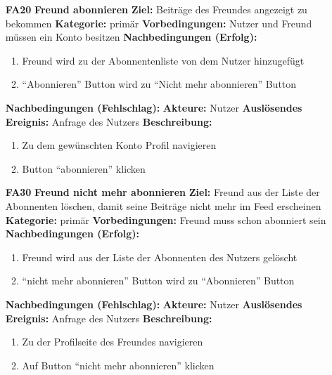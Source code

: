 \documentclass[parskip=full]{scrartcl}
\begin{document}
\begin{itemize}[nosep]
			\item[\textbf{\large FA20}]\textbf{\large Freund abonnieren}
				\newline\newline \textbf{Ziel:} Beiträge des Freundes angezeigt zu bekommen
				\newline \textbf{Kategorie:} primär
				\newline \textbf{Vorbedingungen:} Nutzer und Freund müssen ein Konto besitzen
				\newline \textbf{Nachbedingungen (Erfolg):} 
				\begin{enumerate}[nosep]
					\item Freund wird zu der Abonnentenliste von dem Nutzer hinzugefügt
					\item “Abonnieren” Button wird zu “Nicht mehr abonnieren” Button
				\end{enumerate}
				\textbf{Nachbedingungen (Fehlschlag):}
				\newline \textbf{Akteure:} Nutzer
				\newline \textbf{Auslösendes Ereignis:} Anfrage des Nutzers
				\newline \textbf{Beschreibung:}
				\begin{enumerate}[nosep]
					\item Zu dem gewünschten Konto Profil navigieren
					\item Button “abonnieren” klicken
				\end{enumerate}
			
			\item[\textbf{\large FA30}]\textbf{\large Freund nicht mehr abonnieren}
				\newline \textbf{Ziel:} Freund aus der Liste der Abonnenten löschen, damit seine Beiträge nicht mehr im Feed erscheinen
				\newline \textbf{Kategorie:} primär
				\newline \textbf{Vorbedingungen:} Freund muss schon abonniert sein
				\newline \textbf{Nachbedingungen (Erfolg):} 
				\begin{enumerate}[nosep]
					\item Freund wird aus der Liste der Abonnenten des Nutzers gelöscht
					\item “nicht mehr abonnieren” Button wird zu “Abonnieren” Button
				\end{enumerate}
				\textbf{Nachbedingungen (Fehlschlag):}
				\newline \textbf{Akteure:} Nutzer
				\newline \textbf{Auslösendes Ereignis:} Anfrage des Nutzers
				\newline \textbf{Beschreibung:}
				\begin{enumerate}[nosep]
					\item Zu der Profilseite des Freundes navigieren
					\item Auf Button “nicht mehr abonnieren” klicken
				\end{enumerate}
		\end{itemize}
		
\end{document}
